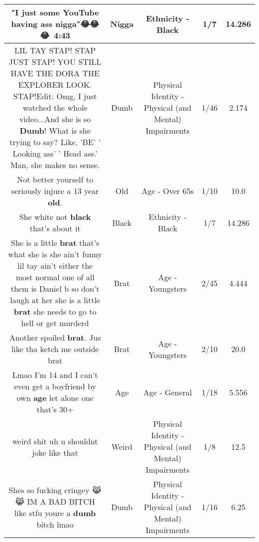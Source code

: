 \documentclass[11pt]{article}
\newlength\mylength
\begin{document}
\begin{center}
\begin{longtable}{|C{.65\mylength}|C{.30\mylength}|C{.12\mylength}|C{.12\mylength}|C{.12\mylength}|}
  \small "I just some YouTube having ass \textbf{nigga}"😂😂😂👏👏4:43\normalsize   & Nigga & Ethnicity - Black & 1/7 & 14.286 \\  \hline
  \small LIL TAY STAP! STAP JUST STAP! YOU STILL HAVE THE DORA THE EXPLORER LOOK. STAP!Edit: Omg, I just watched the whole video...And she is so \textbf{Dumb}! What is she trying to say? Like, 'BE' ' Looking ass' ' Head ass.' Man, she makes no sense.\normalsize   & Dumb & Physical Identity - Physical (and Mental) Impairments & 1/46 & 2.174 \\  \hline
  \small Not better yourself to seriously injure a 13 year \textbf{old}.\normalsize   & Old & Age - Over 65s & 1/10 & 10.0 \\  \hline
  \small She white not \textbf{black} that's about it\normalsize   & Black & Ethnicity - Black & 1/7 & 14.286 \\  \hline
  \small She is a little \textbf{brat} that's what she is she ain't funny lil tay ain't either the most normal one of all them is Daniel b so don't laugh at her she is a little \textbf{brat} she needs to go to hell or get murderd\normalsize   & Brat & Age - Youngsters & 2/45 & 4.444 \\  \hline
  \small Another spoiled \textbf{brat}. Jus like tha ketch me outside brat\normalsize   & Brat & Age - Youngsters & 2/10 & 20.0 \\  \hline
  \small Lmao I'm 14 and I can't even get a boyfriend by own \textbf{age} let alone one that's 30+\normalsize   & Age & Age - General & 1/18 & 5.556 \\  \hline
  \small weird shit uh u shouldnt joke like that\normalsize   & Weird & Physical Identity - Physical (and Mental) Impairments & 1/8 & 12.5 \\  \hline
  \small Shes so fucking cringey 😹😹 IM A BAD BITCH like stfu youre a \textbf{dumb} bitch lmao\normalsize   & Dumb & Physical Identity - Physical (and Mental) Impairments & 1/16 & 6.25 \\  \hline

\end{longtable}
\end{center}
\end{document}
